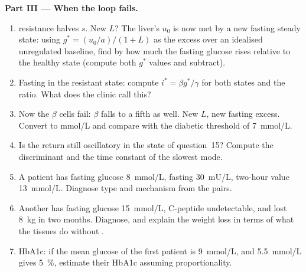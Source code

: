 \begin{problem}
\medskip
\noindent\textbf{Part III --- When the loop fails.}
\begin{enumerate}[resume]
  \item {} resistance halves $s$. New $L$? The liver's $u_{0}$ is
        now met by a new fasting steady state: using $g^{*} = (u_{0}/a)/(1
        + L)$ as the excess over an idealised unregulated baseline, find
        by how much the fasting glucose rises relative to the healthy
        state (compute both $g^{*}$ values and subtract).
  \item Fasting  in the resistant state: compute $i^{*} = \beta
        g^{*}/\gamma$ for both states and the ratio. What does the
        clinic call this?
  \item Now the $\beta$ cells fail: $\beta$ falls to a fifth as well.
        New $L$, new fasting excess. Convert to mmol/L and compare with
        the diabetic threshold of \qty{7}{mmol/L}.
  \item Is the return still oscillatory in the state of question~15?
        Compute the discriminant and the time constant of the slowest
        mode.
  \item A patient has fasting glucose \qty{8}{mmol/L}, fasting 
        \qty{30}{mU/L}, two-hour value \qty{13}{mmol/L}. Diagnose type
        and mechanism from the pairs.
  \item Another has fasting glucose \qty{15}{mmol/L}, C-peptide
        undetectable, and lost \qty{8}{kg} in two months. Diagnose, and
        explain the weight loss in terms of what the tissues do without
        .
  \item HbA1c: if the mean glucose of the first patient is
        \qty{9}{mmol/L}, and \qty{5.5}{mmol/L} gives \qty{5}{\%}, estimate
        their HbA1c assuming proportionality.
\end{enumerate}


\end{problem}
